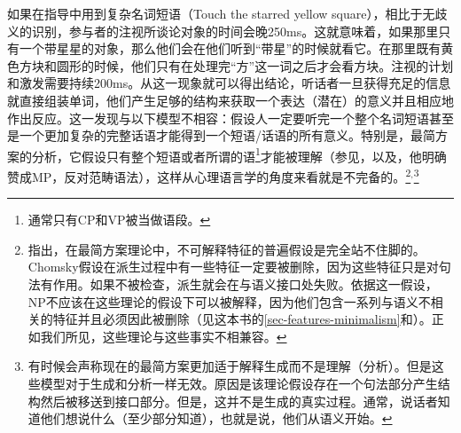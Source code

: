 如果在指导中用到复杂名词短语（Touch the starred yellow square），相比于无歧义的识别，参与者的注视所谈论对象的时间会晚250ms。这就意味着，如果那里只有一个带星星的对象，那么他们会在他们听到“带星”的时候就看它。在那里既有黄色方块和圆形的时候，他们只有在处理完“方”这一词之后才会看方块\citep[]{TSKES95a}。注视的计划和激发需要持续200ms。从这一现象就可以得出结论，听话者一旦获得充足的信息就直接组装单词，他们产生足够的结构来获取一个表达（潜在）的意义并且相应地作出反应。这一发现与以下模型不相容：假设人一定要听完一个整个名词短语甚至是一个更加复杂的完整话语才能得到一个短语/话语的所有意义。特别是，最简方案\indexmpc 的分析，它假设只有整个短语或者所谓的语\footnote{%
     通常只有CP和VP被当做语段。
}才能被理解（参见\citealp{Chomsky99a}，以及\citealp[]{Marantz2005a}，他明确赞成MP\indexmpc，反对范畴语法\indexcgc），这样从心理语言学的角度来看就是不完备的。\footnote{%
 \citet[--730]{Sternefeld2006a-u}指出，在最简方案理论中，不可解释特征的普遍假设是完全站不住脚的。Chomsky假设在派生过程中有一些特征一定要被删除，因为这些特征只是对句法有作用。如果不被检查，派生就会在与语义接口处失败。依据这一假设，NP不应该在这些理论的假设下可以被解释，因为他们包含一系列与语义不相关的特征并且必须因此被删除（见这本书的\ref{sec-features-minimalism}和\citealp{Richards2015a}）。正如我们所见，这些理论与这些事实不相兼容。
}$^,$\footnote{%
有时候会声称现在的最简方案更加适于解释生成而不是理解（分析）。但是这些模型对于生成和分析一样无效。原因是该理论假设存在一个句法部分产生结构然后被移送到接口部分。但是，这并不是生成的真实过程。通常，说话者知道他们想说什么（至少部分知道），也就是说，他们从语义开始。
}
